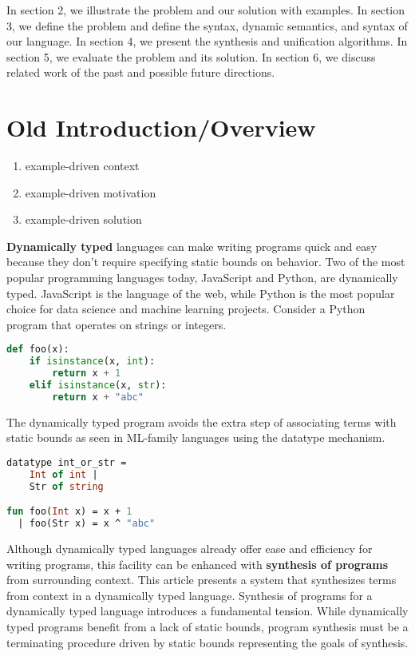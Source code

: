 \documentclass[sigplan,screen]{acmart}
\begin{document}

In section 2, we illustrate the problem and our solution with examples.
In section 3, we define the problem and define the syntax, dynamic semantics, and syntax of our language.
In section 4, we present the synthesis and unification algorithms.
In section 5, we evaluate the problem and its solution. 
In section 6, we discuss related work of the past and possible future directions. 

\section{Old Introduction/Overview}

\begin{enumerate}
  \item example-driven context 
  \item example-driven motivation
  \item example-driven solution  
\end{enumerate}


\textbf{Dynamically typed} languages can make writing programs quick and easy 
because they don't require specifying static bounds on behavior.
Two of the most popular programming languages today, JavaScript and Python, 
are dynamically typed. 
JavaScript is the language of the web, while Python is the most popular choice
for data science and machine learning projects. 
Consider a Python program that operates on strings or integers. 

\begin{lstlisting}[language=Python]
def foo(x):
    if isinstance(x, int):
        return x + 1 
    elif isinstance(x, str): 
        return x + "abc"
\end{lstlisting}

\noindent The dynamically typed program avoids the extra step of associating terms with
static bounds as seen in ML-family languages using the datatype mechanism. 

\begin{lstlisting}[language=ML]
datatype int_or_str = 
    Int of int | 
    Str of string

fun foo(Int x) = x + 1
  | foo(Str x) = x ^ "abc"
\end{lstlisting}


Although dynamically typed languages already offer ease and efficiency for writing programs, 
this facility can be enhanced with \textbf{synthesis of programs} 
from surrounding context. 
This article presents a system that synthesizes terms from context 
in a dynamically typed language.
Synthesis of programs for a dynamically typed language introduces a fundamental tension. 
While dynamically typed programs benefit from a lack of static bounds, program synthesis
must be a terminating procedure driven by static bounds representing the goals of synthesis.   
\end{document}
